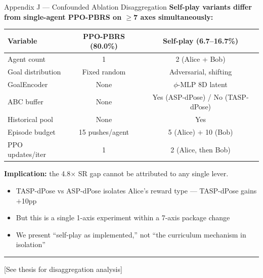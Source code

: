 \documentclass[aspectratio=169,xcolor=dvipsnames,t]{beamer}
\newcommand{\litfooter}[1]{%
  \vspace{2pt}%
  \hrule%
  \vspace{2pt}%
  {\tiny\color{LightDarkGrey} #1}%
}
\begin{document}
\begin{frame}[t]{Appendix J — Confounded Ablation Disaggregation}
  \small
  \textbf{Self-play variants differ from single-agent PPO-PBRS on $\ge$7 axes simultaneously:}

  \vspace{4pt}
  {\footnotesize
  \begin{tabular}{lcc}
    \toprule
    \textbf{Variable} & \textbf{PPO-PBRS (80.0\%)} & \textbf{Self-play (6.7--16.7\%)} \\
    \midrule
    Agent count     & 1 & 2 (Alice + Bob) \\
    Goal distribution & Fixed random & Adversarial, shifting \\
    GoalEncoder     & None & $\phi$-MLP 8D latent \\
    ABC buffer      & None & Yes (ASP-dPose) / No (TASP-dPose) \\
    Historical pool & None & Yes \\
    Episode budget  & 15 pushes/agent & 5 (Alice) $+$ 10 (Bob) \\
    PPO updates/iter& 1 & 2 (Alice, then Bob) \\
    \bottomrule
  \end{tabular}
  }

  \vspace{4pt}
  \textbf{Implication:} the 4.8$\times$ SR gap cannot be attributed to any single lever.
  \begin{itemize}
    \item TASP-dPose vs ASP-dPose isolates Alice's reward type — TASP-dPose gains $+$10pp
    \item But this is a single 1-axis experiment within a 7-axis package change
    \item We present ``self-play as implemented,'' not ``the curriculum mechanism in isolation''
  \end{itemize}

  \vfill\litfooter{[See thesis  for disaggregation analysis]}
\end{frame}
\end{document}
